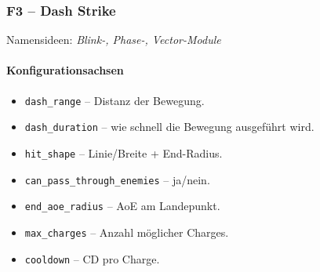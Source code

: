 \subsubsection{F3 – Dash Strike}
Namensideen: \emph{Blink-, Phase-, Vector-Module}

\paragraph{Konfigurationsachsen}{}

\begin{itemize}
	\item \texttt{dash\_range} – Distanz der Bewegung.
	\item \texttt{dash\_duration} – wie schnell die Bewegung ausgeführt wird.
	\item \texttt{hit\_shape} – Linie/Breite + End-Radius.
	\item \texttt{can\_pass\_through\_enemies} – ja/nein.
	\item \texttt{end\_aoe\_radius} – AoE am Landepunkt.
	\item \texttt{max\_charges} – Anzahl möglicher Charges.
	\item \texttt{cooldown} – CD pro Charge.
\end{itemize}

